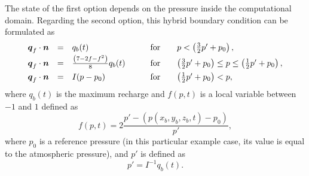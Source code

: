 The state of the first option depends on the pressure inside the computational domain.
Regarding the second option, this hybrid boundary condition \citep[based on][]{hamm2000} can be formulated as
\begin{equation} \label{eq:fifth_bc_richard DP}
\begin{array} {lllll}
  {\boldsymbol{q}}_f \cdot \boldsymbol{n} & = & q_{b}(t) & \qquad \text{for} \quad &  p < \left( \frac{3}{2} p' + p_{0} \right), \\[0.5ex]
  {\boldsymbol{q}}_f \cdot \boldsymbol{n} & = & \frac{\left(  7-2f-f^{2}  \right)}{8} q_{b}(t) 
                    & \qquad \text{for} \quad &  \left( \frac32 p' + p_{0} \right) \leq p \leq \left( \frac12 p' + p_{0} \right), \\[1.0ex]
  {\boldsymbol{q}}_f \cdot \boldsymbol{n} & = & I (p - p_{0}) &  \qquad \text{for} \quad & \left( \frac{1}{2} p' + p_{0} \right) < p, 
\end{array} 
\end{equation}
where $q_{b}(t)$ is the maximum recharge and $f(p,t)$ is a local variable between $-1$ and $1$ 
defined as 
\begin{equation}
  f(p,t) = 2 \frac{p'- (p(x_{b},y_{b},z_{b},t) - p_{0}) }{p'},
\end{equation}
where $p_{0}$ is a reference pressure (in this particular example case, its value is equal to 
the atmospheric pressure), and $p'$ is defined as 
\begin{equation}
  p' = I^{-1} q_{b}(t).
\end{equation}







%
%

